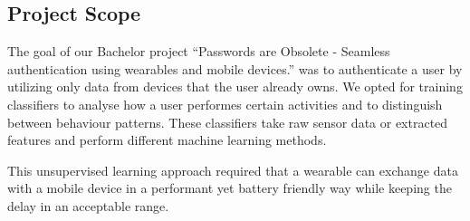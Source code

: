 \subsection{Project Scope}
\label{sec:intro:scope}
The goal of our Bachelor project ``Passwords are Obsolete - Seamless authentication using wearables and mobile devices.'' was to authenticate a user by utilizing only data from devices that the user already owns. We opted for training classifiers to analyse how a user performes certain activities and to distinguish between behaviour patterns. These classifiers take raw sensor data or extracted features and perform different machine learning methods.

This unsupervised learning approach required that a wearable can exchange data with a mobile device in a performant yet battery friendly way while keeping the delay in an acceptable range.

\clearpage